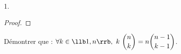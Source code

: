 \documentclass[11pt]{article}%
\begin{document}
\begin{noliste}{1.}
\begin{proof}
  \end{proof}




\item Démontrer que : $\forall k \in \llb 1, n\rrb, \ k \
  \dbinom{n}{k} = n \dbinom{n-1}{k-1}$.


\end{noliste}
\end{document}
